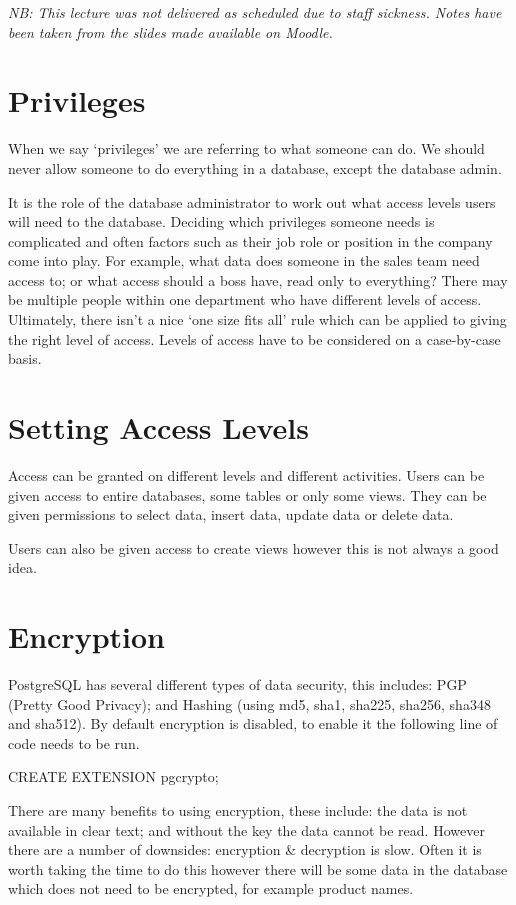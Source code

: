 \textit{NB: This lecture was not delivered as scheduled due to staff sickness. Notes have been taken from the slides made available on Moodle.}

\section*{Privileges}
When we say `privileges' we are referring to what someone can do. We should never allow someone to do everything in a database, except the database admin.

It is the role of the database administrator to work out what access levels users will need to the database. Deciding which privileges someone needs is complicated and often factors such as their job role or position in the company come into play. For example, what data does someone in the sales team need access to; or what access should a boss have, read only to everything? There may be multiple people within one department who have different levels of access. Ultimately, there isn't a nice `one size fits all' rule which can be applied to giving the right level of access. Levels of access have to be considered on a case-by-case basis.

\section*{Setting Access Levels}
Access can be granted on different levels and different activities. Users can be given access to entire databases, some tables or only some views. They can be given permissions to select data, insert data, update data or delete data. 

Users can also be given access to create views however this is not always a good idea.

\section*{Encryption}
PostgreSQL has several different types of data security, this includes: PGP (Pretty Good Privacy); and Hashing (using md5, sha1, sha225, sha256, sha348 and sha512). By default encryption is disabled, to enable it the following line of code needs to be run.
\begin{sql}
CREATE EXTENSION pgcrypto;
\end{sql}

There are many benefits to using encryption, these include: the data is not available in clear text; and without the key the data cannot be read. However there are a number of downsides: encryption \& decryption is slow. Often it is worth taking the time to do this however there will be some data in the database which does not need to be encrypted, for example product names. 

